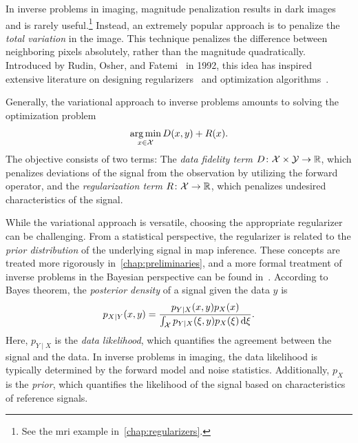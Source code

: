 In inverse problems in imaging, magnitude penalization results in dark images and is rarely useful.\footnote{%
	See the \gls{mri} example in~\cref{chap:regularizers}.
}
Instead, an extremely popular approach is to penalize the \emph{total variation} in the image.
This technique penalizes the difference between neighboring pixels absolutely, rather than the magnitude quadratically.
Introduced by Rudin, Osher, and Fatemi~\cite{rudin_nonlinear_1992} in \num{1992}, this idea has inspired extensive literature on designing regularizers~\cite{Benning_Burger_2018,bredies_total_2010,RoBl09} and optimization algorithms~\cite{chambolle_primal_2010}.

Generally, the variational approach to inverse problems amounts to solving the optimization problem
\begin{equation}
	\operatorname*{arg\,min}_{x \in \mathcal{X}} D(x, y) + R(x).
	\label{eq:intro variational}
\end{equation}
The objective consists of two terms:
The \emph{data fidelity term} \( D \colon \mathcal{X} \times \mathcal{Y} \to \mathbb{R} \), which penalizes deviations of the signal from the observation by utilizing the forward operator, and the \emph{regularization term} \( R \colon \mathcal{X} \to \mathbb{R} \), which penalizes undesired characteristics of the signal.

While the variational approach is versatile, choosing the appropriate regularizer can be challenging.
From a statistical perspective, the regularizer is related to the \emph{prior distribution} of the underlying signal in \gls{map} inference.
These concepts are treated more rigorously in~\cref{chap:preliminaries}, and a more formal treatment of inverse problems in the Bayesian perspective can be found in~\cite{Stuart_2010}.
According to Bayes theorem, the \emph{posterior density} of a signal given the data \( y \) is
\begin{equation}
	p_{X \mid Y}(x, y) = \frac{p_{Y\mid X}(x, y)p_X(x)}{\int_{\mathcal{X}}p_{Y\mid X}(\xi, y)p_X(\xi)\,\mathrm{d}\xi}.
	\label{eq:intro bayes}
\end{equation}
Here, \( p_{Y\mid X} \) is the \emph{data likelihood}, which quantifies the agreement between the signal and the data.
In inverse problems in imaging, the data likelihood is typically determined by the forward model and noise statistics.
Additionally, \( p_X \) is the \emph{prior}, which quantifies the likelihood of the signal based on characteristics of reference signals.

